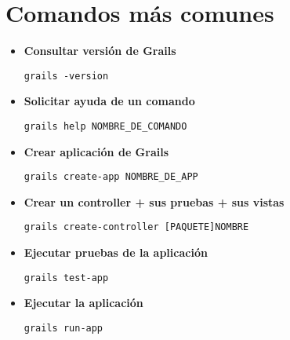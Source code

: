 \chapter{Comandos m\'as comunes}

\begin{itemize}

    \item \textbf{Consultar versi\'on de Grails}    
        \begin{lstlisting}[gobble=11] 
            grails -version
        \end{lstlisting}

    \item \textbf{Solicitar ayuda de un comando}
        \begin{lstlisting}[gobble=11]
            grails help NOMBRE_DE_COMANDO
        \end{lstlisting}

    \item \textbf{Crear aplicaci\'on de Grails}
        \begin{lstlisting}[gobble=11]
            grails create-app NOMBRE_DE_APP
        \end{lstlisting}


    \item \textbf{Crear un controller + sus pruebas + sus vistas}
        \begin{lstlisting}[gobble=11]
            grails create-controller [PAQUETE]NOMBRE
        \end{lstlisting}

    \item \textbf{Ejecutar pruebas de la aplicaci\'on}
        \begin{lstlisting}[gobble=11]
            grails test-app
        \end{lstlisting}

    \item \textbf{Ejecutar la aplicaci\'on}
        \begin{lstlisting}[gobble=11]
            grails run-app
        \end{lstlisting}
        
\end{itemize}
